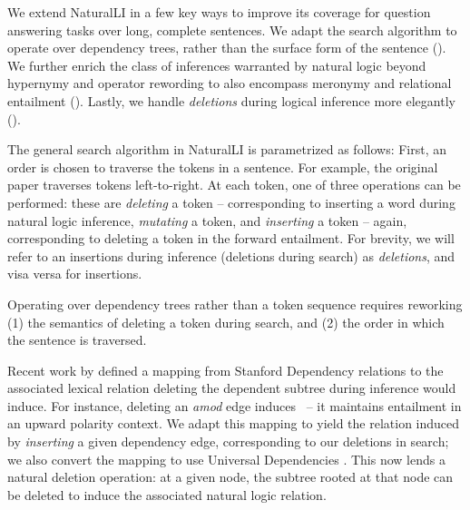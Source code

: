 We extend NaturalLI in a few key ways to improve its coverage for question
  answering tasks over long, complete sentences.
We adapt the search algorithm to operate over dependency
  trees, rather than the surface form of the sentence ().
We further enrich the class of inferences warranted by natural logic beyond
  hypernymy and operator rewording to also encompass meronymy and
  relational entailment ().
Lastly, we handle \textit{deletions} during logical inference more elegantly
  ().

The general search algorithm in NaturalLI is parametrized as follows:
First, an order is chosen to traverse the tokens in a sentence.
For example, the original paper traverses tokens left-to-right.
At each token, one of three operations can be performed:
  these are \textit{deleting} a token
  -- corresponding to inserting a word during natural logic inference,
  \textit{mutating} a token, and \textit{inserting} a token -- again, corresponding
  to deleting a token in the forward entailment.
For brevity, we will refer to an insertions during inference (deletions during
  search) as \textit{deletions}, and visa versa for insertions.

%
%
Operating over dependency trees rather than a token sequence requires reworking
  (1) the semantics of deleting a token during search, and 
  (2) the order in which the sentence is traversed.


Recent work by  defined a mapping from Stanford
  Dependency relations to the associated lexical relation deleting the
  dependent subtree during inference would induce.
For instance, deleting an \textit{amod} edge induces \forward\ -- it maintains
  entailment in an upward polarity context.
We adapt this mapping to yield the relation induced by \textit{inserting} a
  given dependency edge, corresponding to our deletions in search;
  we also convert the mapping to use Universal Dependencies
  \cite{key:stanford-ud}.
This now lends a natural deletion operation: at a given node, the subtree rooted
  at that node can be deleted to induce the associated natural logic relation.

